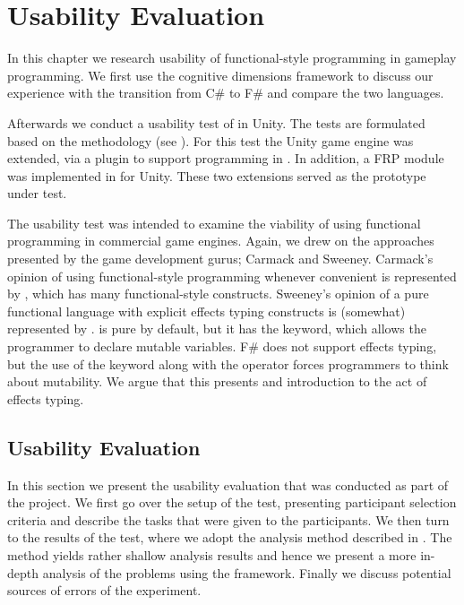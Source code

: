 \chapter{Usability Evaluation}
In this chapter we research usability of functional-style programming in gameplay programming. We first use the cognitive dimensions framework to discuss our experience with the transition from C\# to F\# and compare the two languages.

Afterwards we conduct a usability test of \fs in Unity. The tests are formulated based on the \champagne methodology (see ). For this test the Unity game engine was extended, via a plugin to support programming in \fs\cite{fsharp2019plugin}. In addition, a \gls{FRP} module was implemented in \fs for Unity. These two extensions served as the prototype under test.%

The usability test was intended to examine the viability of using functional programming in commercial game engines. Again, we drew on the approaches presented by the game development gurus; Carmack and Sweeney. Carmack's opinion of using functional-style programming whenever convenient is represented by \cs, which has many functional-style constructs. Sweeney's opinion of a pure functional language with explicit effects typing constructs is (somewhat) represented by \fs. \fs is pure by default, but it has the  keyword, which allows the programmer to declare mutable variables. F\# does not support effects typing, but the use of the  keyword along with the \ttt{\textless-} operator forces programmers to think about mutability. We argue that this presents and  introduction to the act of effects typing.


\section{Usability Evaluation}
In this section we present the usability evaluation that was conducted as part of the project. We first go over the setup of the test, presenting participant selection criteria and describe the tasks that were given to the participants. We then turn to the results of the test, where we adopt the analysis method described in \champagne\cite{blackwell2004champagne}. The \champagne method yields rather shallow analysis results and hence we present a more in-depth analysis of the problems using the \cognitive framework. Finally we discuss potential sources of errors of the experiment.




